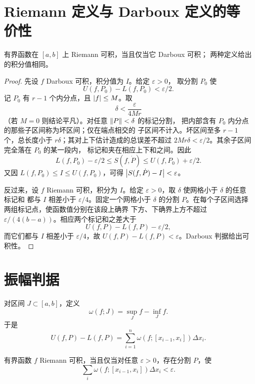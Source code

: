 \section{Riemann 定义与 Darboux 定义的等价性}

\begin{theorem}[两种积分定义等价]
\label{thm:riemann-darboux-equivalence}
有界函数在 \([a,b]\) 上 Riemann 可积，当且仅当它 Darboux 可积；
两种定义给出的积分值相同。
\end{theorem}

\begin{proof}
先设 \(f\) Darboux 可积，积分值为 \(I\)。给定 \(\varepsilon>0\)，
取分割 \(P_0\) 使
\[
 U(f,P_0)-L(f,P_0)<\varepsilon/2.
\]
记 \(P_0\) 有 \(r-1\) 个内分点，且 \(\left|f\right|\le M\)。取
\[
 \delta<\frac{\varepsilon}{4Mr}
\]
（若 \(M=0\) 则结论平凡）。对任意 \(\left\lVert P\right\rVert<\delta\) 的标记分割，
把内部含有 \(P_0\) 内分点的那些子区间称为坏区间；仅在端点相交的
子区间不计入。坏区间至多 \(r-1\)
个，总长度小于 \(r\delta\)；其对上下估计造成的总误差不超过
\(2Mr\delta<\varepsilon/2\)。其余子区间完全落在 \(P_0\) 的某一段内，
标记和夹在相应上下和之间。因此
\[
 L(f,P_0)-\varepsilon/2
 \le S(f,\dot P)
 \le U(f,P_0)+\varepsilon/2.
\]
又因 \(L(f,P_0)\le I\le U(f,P_0)\)，可得
\(\left|S(f,\dot P)-I\right|<\varepsilon\)。

反过来，设 \(f\) Riemann 可积，积分为 \(I\)。给定
\(\varepsilon>0\)，取 \(\delta\) 使网格小于 \(\delta\) 的任意标记和
都与 \(I\) 相差小于 \(\varepsilon/4\)。固定一个网格小于 \(\delta\)
的分割 \(P\)。在每个子区间选择两组标记点，使函数值分别在该段上确界
下方、下确界上方不超过
\(\varepsilon/(4(b-a))\)。相应两个标记和之差大于
\[
 U(f,P)-L(f,P)-\varepsilon/2,
\]
而它们都与 \(I\) 相差小于 \(\varepsilon/4\)，故
\(U(f,P)-L(f,P)<\varepsilon\)。Darboux 判据给出可积性。
\end{proof}

\section{振幅判据}

对区间 \(J\subset[a,b]\)，定义
\[
 \omega(f;J)=\sup_J f-\inf_J f.
\]
于是
\[
 U(f,P)-L(f,P)
 =\sum_{i=1}^n\omega(f;[x_{i-1},x_i])\Delta x_i.
\]

\begin{theorem}[振幅判据]
\label{thm:riemann-oscillation-criterion}
有界函数 \(f\) Riemann 可积，当且仅当对任意
\(\varepsilon>0\)，存在分割 \(P\)，使
\[
 \sum_i\omega(f;[x_{i-1},x_i])\Delta x_i<\varepsilon.
\]
\end{theorem}

